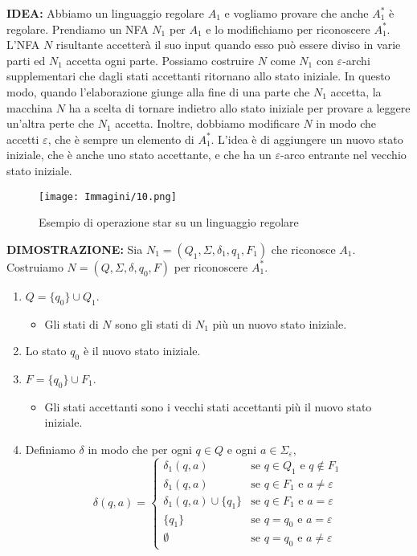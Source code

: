 \documentclass{article}
\begin{document}
\textbf{IDEA:}
Abbiamo un linguaggio regolare $A_{1}$ e vogliamo provare che anche $A^{*}_{1}$ è regolare. Prendiamo un NFA $N_{1}$ per $A_{1}$ e lo modifichiamo per riconoscere $A^{*}_{1}$. L'NFA $N$ risultante accetterà il suo input quando esso può essere diviso in varie parti ed $N_{1}$ accetta ogni parte.
Possiamo costruire $N$ come $N_{1}$ con $\varepsilon$-archi supplementari che dagli stati accettanti ritornano allo stato iniziale. In questo modo, quando l'elaborazione giunge alla fine di una parte che $N_{1}$ accetta, la macchina $N$ ha a scelta di tornare indietro allo stato iniziale per provare a leggere un'altra perte che $N_{1}$ accetta. Inoltre,  dobbiamo modificare $N$ in modo che accetti $\varepsilon$, che è sempre un elemento di $A^{*}_{1}$. L'idea è di aggiungere un nuovo stato iniziale, che è anche uno stato accettante, e che ha un $\varepsilon$-arco entrante nel vecchio stato iniziale.
\vspace{1em}

\begin{figure}[H]
    \centering
    \texttt{[image: Immagini/10.png]}
    \caption{Esempio di operazione star su un linguaggio regolare}
    \label{fig:star_example1}
\end{figure}

\textbf{DIMOSTRAZIONE:}
Sia $N_{1} = (Q_{1},\Sigma,\delta_{1},q_{1},F_{1})$ che riconosce $A_{1}$.
Costruiamo $N = (Q,\Sigma,\delta,q_{0},F)$ per riconoscere $A^{*}_{1}$.
\begin{enumerate}
    \item $Q = \{q_{0}\}\cup Q_{1}.$
        \begin{itemize}
            \item Gli stati di $N$ sono gli stati di $N_{1}$ più un nuovo stato iniziale.
        \end{itemize}
    \item Lo stato $q_{0}$ è il nuovo stato iniziale.
    \item $F = \{q_{0}\} \cup F_{1}.$
        \begin{itemize}
            \item Gli stati accettanti sono i vecchi stati accettanti più il nuovo stato iniziale.
        \end{itemize}
    \item Definiamo $\delta$ in modo che per ogni $q \in Q$ e ogni $a \in \Sigma_\varepsilon$,
    \[
    \delta(q,a) =
    \begin{cases}
        \delta_{1}(q,a) & \text{se } q \in Q_{1} \text{ e } q \notin F_{1} \\
        \delta_{1}(q,a) & \text{se } q \in F_{1} \text{ e } a \neq \varepsilon \\
        \delta_{1}(q,a) \cup \{q_{1}\} & \text{se } q \in F_{1} \text{ e } a = \varepsilon \\
        \{q_{1}\} & \text{se } q = q_{0} \text{ e } a = \varepsilon \\
        \emptyset & \text{se } q = q_{0} \text{ e } a \neq \varepsilon
    \end{cases}
    \]
\end{enumerate}
\vspace{4em}
\end{document}
